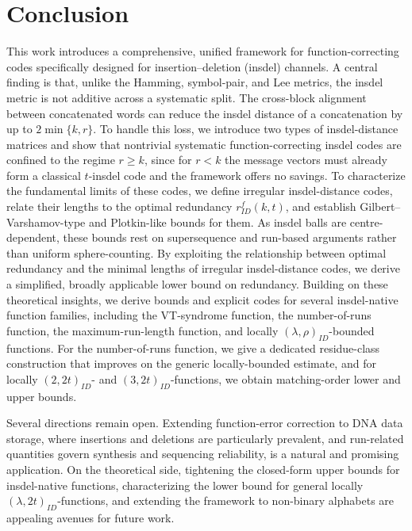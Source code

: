 \documentclass[11 pt]{article}
\numberwithin{equation}{section}
\begin{document}
\section{Conclusion}
This work introduces a comprehensive, unified framework for function-correcting codes specifically designed for insertion–deletion (insdel) channels. A central finding is that, unlike the Hamming, symbol-pair, and Lee metrics, the insdel metric is not additive across a systematic split. The cross-block alignment between concatenated words can reduce the insdel distance of a concatenation by up to $2\min\{k,r\}$. To handle this loss, we introduce two types of insdel-distance matrices and show that nontrivial systematic function-correcting insdel codes are confined to the regime $r \ge k$, since for $r < k$ the message vectors must already form a classical $t$-insdel code and the framework offers no savings. To characterize the fundamental limits of these codes, we define irregular insdel-distance codes, relate their lengths to the optimal redundancy $r^{f}_{ID}(k,t)$, and establish Gilbert–Varshamov-type and Plotkin-like bounds for them. As insdel balls are centre-dependent, these bounds rest on supersequence and run-based arguments rather than uniform sphere-counting. By exploiting the relationship between optimal redundancy and the minimal lengths of irregular insdel-distance codes, we derive a simplified, broadly applicable lower bound on redundancy. Building on these theoretical insights, we derive bounds and explicit codes for several insdel-native function families, including the VT-syndrome function, the number-of-runs function, the maximum-run-length function, and locally $(\lambda, \rho)_{ID}$-bounded functions. For the number-of-runs function, we give a dedicated residue-class construction that improves on the generic locally-bounded estimate, and for locally $(2,2t)_{ID}$- and $(3,2t)_{ID}$-functions, we obtain matching-order lower and upper bounds.

Several directions remain open. Extending function-error correction to DNA data storage, where insertions and deletions are particularly prevalent, and run-related quantities govern synthesis and sequencing reliability, is a natural and promising application. On the theoretical side, tightening the closed-form upper bounds for insdel-native functions, characterizing the lower bound for general locally $(\lambda, 2t)_{ID}$-functions, and extending the framework to non-binary alphabets are appealing avenues for future work.
\end{document}
